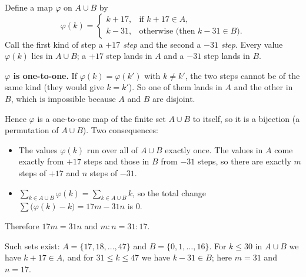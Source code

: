 Define a map $\varphi$ on $A\cup B$ by
\[
\varphi(k)=\begin{cases}k+17,&\text{if }k+17\in A,\\ k-31,&\text{otherwise (then }k-31\in B).\end{cases}
\]
Call the first kind of step a \emph{$+17$ step} and the second a \emph{$-31$ step}. Every value $\varphi(k)$ lies in $A\cup B$; a $+17$ step lands in $A$ and a $-31$ step lands in $B$.

\textbf{$\varphi$ is one-to-one.} If $\varphi(k)=\varphi(k')$ with $k\ne k'$, the two steps cannot be of the same kind (they would give $k=k'$). So one of them lands in $A$ and the other in $B$, which is impossible because $A$ and $B$ are disjoint.

Hence $\varphi$ is a one-to-one map of the finite set $A\cup B$ to itself, so it is a bijection (a permutation of $A\cup B$). Two consequences:
\begin{itemize}
\item The values $\varphi(k)$ run over all of $A\cup B$ exactly once. The values in $A$ come exactly from $+17$ steps and those in $B$ from $-31$ steps, so there are exactly $m$ steps of $+17$ and $n$ steps of $-31$.
\item $\displaystyle\sum_{k\in A\cup B}\varphi(k)=\sum_{k\in A\cup B}k$, so the total change $\displaystyle\sum\bigl(\varphi(k)-k\bigr)=17m-31n$ is $0$.
\end{itemize}
Therefore $17m=31n$ and $\boxed{m:n=31:17}$.

Such sets exist: $A=\{17,18,\dots,47\}$ and $B=\{0,1,\dots,16\}$. For $k\le30$ in $A\cup B$ we have $k+17\in A$, and for $31\le k\le47$ we have $k-31\in B$; here $m=31$ and $n=17$.

